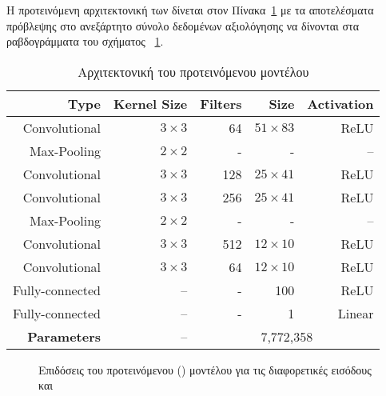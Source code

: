 Η προτεινόμενη αρχιτεκτονική των  δίνεται στον Πίνακα~\ref{tab:padarian.network} με τα αποτελέσματα πρόβλεψης στο ανεξάρτητο σύνολο δεδομένων αξιολόγησης να δίνονται στα ραβδογράμματα του σχήματος ~\ref{fig:padarian.results}.

\begin{table}[!t]
    \centering
    \caption{Αρχιτεκτονική του προτεινόμενου μοντέλου}
    \label{tab:padarian.network}
    \begin{tabular}{@{}rrrrr@{}}\toprule
        Type&Kernel Size&Filters&Size&Activation\\
        \midrule
        Convolutional&$3 \times 3$&64&$51 \times 83$&ReLU\\
        Max-Pooling&$2 \times 2$&-&-&–\\
        Convolutional&$3 \times 3$&128&$25 \times 41$&ReLU\\
        Convolutional&$3 \times 3$&256&$25 \times 41$&ReLU\\
        Max-Pooling&$2 \times 2$&-&-&–\\
        Convolutional&$3 \times 3$&512&$12 \times 10$&ReLU\\
        Convolutional&$3 \times 3$&64&$12 \times 10$&ReLU\\
        Fully-connected&–&-&100&ReLU\\
        Fully-connected&–&-&1&Linear\\
        \addlinespace
        \textbf{Parameters}&–&\multicolumn{3}{c}{7,772,358}\\
        \bottomrule
    \end{tabular}
\end{table}
\begin{figure}[!t]
    \caption{Επιδόσεις του προτεινόμενου () μοντέλου για τις διαφορετικές εισόδους  και }
    \label{fig:padarian.results}
\end{figure}
